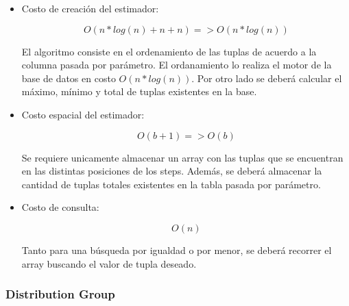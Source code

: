 \documentclass[10pt, a4paper,english,spanish,hidelinks]{article}
\begin{document}
\begin{itemize}

\item Costo de creación del estimador:

\begin{equation}
O(n*log(n) + n + n) => O(n*log(n))
\end{equation}

El algoritmo consiste en el ordenamiento de las tuplas de acuerdo a la columna pasada por
parámetro. El ordanamiento lo realiza el motor de la base de datos en costo $O(n*log(n))$.
Por otro lado se deberá calcular el máximo, mínimo y total de tuplas existentes en la base.

\item Costo espacial del estimador:

\begin{equation}
O(b + 1) => O(b)
\end{equation}

Se requiere unicamente almacenar un array con las tuplas que se encuentran en las distintas
posiciones de los steps. Además, se deberá almacenar la cantidad de tuplas totales
existentes en la tabla pasada por parámetro.

\item Costo de consulta:

\begin{equation}
O(n)
\end{equation}

Tanto para una búsqueda por igualdad o por menor, se deberá recorrer el array buscando
el valor de tupla deseado.

\end{itemize}



\subsubsection{Distribution Group}
\end{document}
